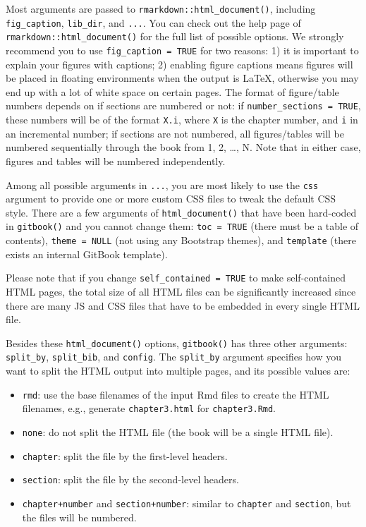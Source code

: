 \documentclass[
  12pt,
]{krantz}
\newcounter{none} %
\providecommand{\tightlist}{%
  \setlength{\itemsep}{0pt}\setlength{\parskip}{0pt}}
\theoremstyle{definition}
\theoremstyle{definition}
\theoremstyle{definition}
\theoremstyle{definition}
\theoremstyle{remark}
\begin{document}
Most arguments are passed to \texttt{rmarkdown::html\_document()}, including \texttt{fig\_caption}, \texttt{lib\_dir}, and \texttt{...}. You can check out the help page of \texttt{rmarkdown::html\_document()} for the full list of possible options. We strongly recommend you to use \texttt{fig\_caption\ =\ TRUE} for two reasons: 1) it is important to explain your figures with captions; 2) enabling figure captions means figures will be placed in floating environments when the output is LaTeX, otherwise you may end up with a lot of white space on certain pages. The format of figure/table numbers depends on if sections are numbered or not: if \texttt{number\_sections\ =\ TRUE}, these numbers will be of the format \texttt{X.i}, where \texttt{X} is the chapter number, and \texttt{i} in an incremental number; if sections are not numbered, all figures/tables will be numbered sequentially through the book from 1, 2, \ldots, N. Note that in either case, figures and tables will be numbered independently.

Among all possible arguments in \texttt{...}, you are most likely to use the \texttt{css} argument to provide one or more custom CSS files to tweak the default CSS style. There are a few arguments of \texttt{html\_document()} that have been hard-coded in \texttt{gitbook()} and you cannot change them: \texttt{toc\ =\ TRUE} (there must be a table of contents), \texttt{theme\ =\ NULL} (not using any Bootstrap themes), and \texttt{template} (there exists an internal GitBook template).

Please note that if you change \texttt{self\_contained\ =\ TRUE} to make self-contained HTML pages, the total size of all HTML files can be significantly increased since there are many JS and CSS files that have to be embedded in every single HTML file.

Besides these \texttt{html\_document()} options, \texttt{gitbook()} has three other arguments: \texttt{split\_by}, \texttt{split\_bib}, and \texttt{config}. The \texttt{split\_by} argument specifies how you want to split the HTML output into multiple pages, and its possible values are:

\begin{itemize}
\tightlist
\item
  \texttt{rmd}: use the base filenames of the input Rmd files to create the HTML filenames, e.g., generate \texttt{chapter3.html} for \texttt{chapter3.Rmd}.
\item
  \texttt{none}: do not split the HTML file (the book will be a single HTML file).
\item
  \texttt{chapter}: split the file by the first-level headers.
\item
  \texttt{section}: split the file by the second-level headers.
\item
  \texttt{chapter+number} and \texttt{section+number}: similar to \texttt{chapter} and \texttt{section}, but the files will be numbered.
\end{itemize}
\end{document}
